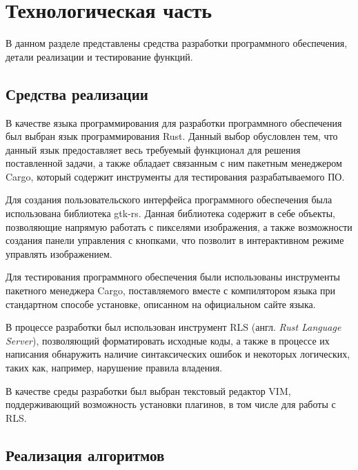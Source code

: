 \chapter{Технологическая часть}

В данном разделе представлены средства разработки программного обеспечения, детали реализации и тестирование функций.

\section{Средства реализации}

В качестве языка программирования для разработки программного обеспечения был выбран язык программирования Rust\cite{rust}. Данный выбор обусловлен тем, что данный язык предоставляет весь требуемый функционал для решения поставленной задачи, а также обладает связанным с ним пакетным менеджером Cargo\cite{cargo}, который содержит инструменты для тестирования разрабатываемого ПО\cite{rusttest}.

Для создания пользовательского интерфейса программного обеспечения была использована библиотека gtk-rs\cite{gtk-rs}. Данная библиотека содержит в себе объекты, позволяющие напрямую работать с пикселями изображения, а также возможности создания панели управления с кнопками, что позволит в интерактивном режиме управлять изображением.

Для тестирования программного обеспечения были использованы инструменты пакетного менеджера Cargo\cite{cargo}, поставляемого вместе с компилятором языка при стандартном способе установке, описанном на официальном сайте языка\cite{rust}. 

В процессе разработки был использован инструмент RLS\cite{rls} (англ. \textit{Rust Language Server}), позволяющий форматировать исходные коды, а также в процессе их написания обнаружить наличие синтаксических ошибок и некоторых логических, таких как, например, нарушение правила владения\cite{rust-learn}.

В качестве среды разработки был выбран текстовый редактор VIM\cite{vim}, поддерживающий возможность установки плагинов\cite{vim-plugins}, в том числе для работы с RLS\cite{rls}.

\section{Реализация алгоритмов}

